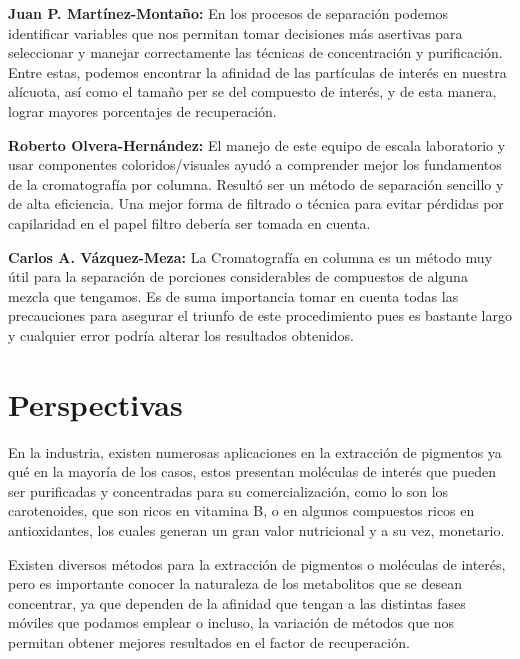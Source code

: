 \documentclass{ITESO-Report}
\begin{document}
{\color{darkgray}\bfseries Juan P. Martínez-Montaño:}\hspace{1em}
En los procesos de separación podemos identificar variables que nos permitan tomar decisiones más asertivas para seleccionar y manejar correctamente las técnicas de concentración y purificación. Entre estas, podemos encontrar la afinidad de las partículas de interés en nuestra alícuota, así como el tamaño per se del compuesto de interés, y de esta manera, lograr mayores porcentajes de recuperación. 

{\color{darkgray}\bfseries Roberto Olvera-Hernández:}\hspace{1em}
El manejo de este equipo de escala laboratorio y usar componentes coloridos/visuales ayudó a comprender mejor los fundamentos de la cromatografía por columna. Resultó ser un método de separación sencillo y de alta eficiencia. Una mejor forma de filtrado o técnica para evitar pérdidas por capilaridad en el papel filtro debería ser tomada en cuenta.

{\color{darkgray}\bfseries Carlos A. Vázquez-Meza:}\hspace{1em}
La Cromatografía en columna es un método muy útil para la separación de porciones considerables de compuestos de alguna mezcla que tengamos. Es de suma importancia tomar en cuenta todas las precauciones para asegurar el triunfo de este procedimiento pues es bastante largo y cualquier error podría alterar los resultados obtenidos.


\section{Perspectivas}\label{perspectivas}

En la industria, existen numerosas aplicaciones en la extracción de pigmentos ya qué en la mayoría de los casos, estos presentan moléculas de interés que pueden ser purificadas y concentradas para su comercialización, como lo son los carotenoides, que son ricos en vitamina B, o en algunos compuestos ricos en antioxidantes, los cuales generan un gran valor nutricional y a su vez, monetario.

Existen diversos métodos para la extracción de pigmentos o moléculas de interés, pero es importante conocer la naturaleza de los metabolitos que se desean concentrar, ya que dependen de la afinidad que tengan a las distintas fases móviles que podamos emplear o incluso, la variación de métodos que nos permitan obtener mejores resultados en el factor de recuperación.
\end{document}
